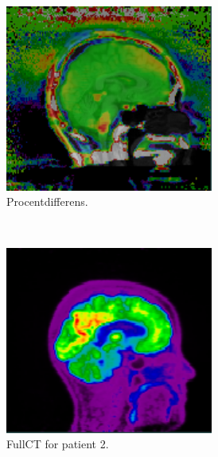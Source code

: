 \begin{figure}
\begin{subfigure}{0.3\textwidth}
        \centering
        \includegraphics[width=0.75\textwidth]{colager/loocv_pet/loocv_010476_pet_pd.png}
        \caption{Procentdifferens.}
        \label{col:loocv_pet_pat1_pd}
    \end{subfigure}\\
    \begin{subfigure}{0.3\textwidth}
        \centering
        \includegraphics[width=0.75\textwidth]{colager/loocv_pet/loocv_010769_pet_ct.png}
        \caption{FullCT for patient 2.}
        \label{col:loocv_pet_pat2_ct}
    \end{subfigure}\hfill
    \begin{subfigure}{0.3\textwidth}
        \centering

\end{subfigure}
\end{figure}
